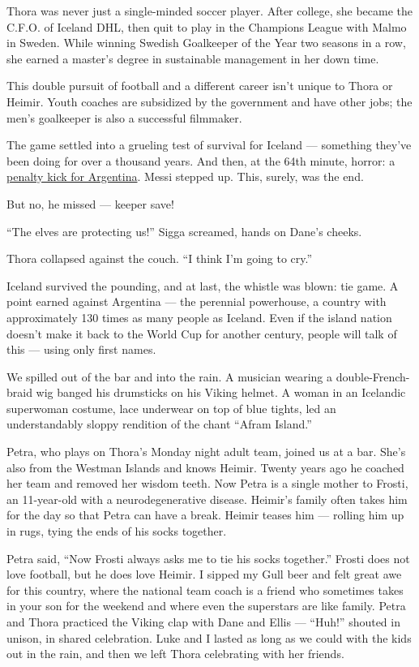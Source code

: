 Thora was never just a single-minded soccer player. After college, she
became the C.F.O. of Iceland DHL, then quit to play in the Champions
League with Malmo in Sweden. While winning Swedish Goalkeeper of the
Year two seasons in a row, she earned a master's degree in sustainable
management in her down time.

This double pursuit of football and a different career isn't unique to
Thora or Heimir. Youth coaches are subsidized by the government and have
other jobs; the men's goalkeeper is also a successful filmmaker.

The game settled into a grueling test of survival for Iceland ---
something they've been doing for over a thousand years. And then, at the
64th minute, horror: a
\href{https://www.theguardian.com/football/live/2018/jun/16/argentina-v-iceland-world-cup-2018-live}{penalty
kick for Argentina}. Messi stepped up. This, surely, was the end.

But no, he missed --- keeper save!

``The elves are protecting us!'' Sigga screamed, hands on Dane's cheeks.

Thora collapsed against the couch. ``I think I'm going to cry.''

Iceland survived the pounding, and at last, the whistle was blown: tie
game. A point earned against Argentina --- the perennial powerhouse, a
country with approximately 130 times as many people as Iceland. Even if
the island nation doesn't make it back to the World Cup for another
century, people will talk of this --- using only first names.

We spilled out of the bar and into the rain. A musician wearing a
double-French-braid wig banged his drumsticks on his Viking helmet. A
woman in an Icelandic superwoman costume, lace underwear on top of blue
tights, led an understandably sloppy rendition of the chant ``Afram
Island.''

Petra, who plays on Thora's Monday night adult team, joined us at a bar.
She's also from the Westman Islands and knows Heimir. Twenty years ago
he coached her team and removed her wisdom teeth. Now Petra is a single
mother to Frosti, an 11-year-old with a neurodegenerative disease.
Heimir's family often takes him for the day so that Petra can have a
break. Heimir teases him --- rolling him up in rugs, tying the ends of
his socks together.

Petra said, ``Now Frosti always asks me to tie his socks together.''
Frosti does not love football, but he does love Heimir. I sipped my Gull
beer and felt great awe for this country, where the national team coach
is a friend who sometimes takes in your son for the weekend and where
even the superstars are like family. Petra and Thora practiced the
Viking clap with Dane and Ellis --- ``Huh!'' shouted in unison, in
shared celebration. Luke and I lasted as long as we could with the kids
out in the rain, and then we left Thora celebrating with her friends.

